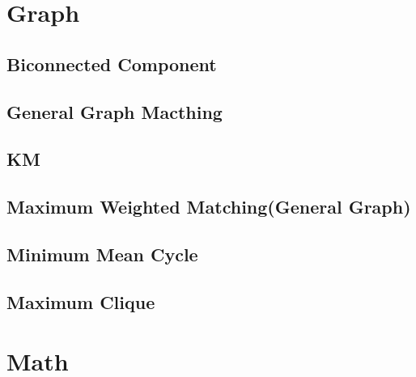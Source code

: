 \documentclass[a4paper,10pt,twocolumn,oneside]{article}
\begin{document}
\section{Graph}
\subsection{Biconnected Component}


\subsection{General Graph Macthing}


\subsection{KM}


\subsection{Maximum Weighted Matching(General Graph)}


\subsection{Minimum Mean Cycle}


\subsection{Maximum Clique}


%

%

\section{Math}
\end{document}
